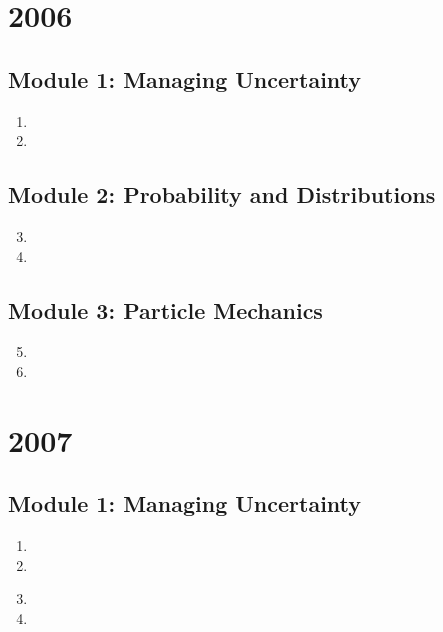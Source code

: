 \documentclass{solutionsmannual}
\begin{document}
\chapter{2006}
\section{Module 1: Managing Uncertainty}
\begin{enumerate}[label=\bfseries  \arabic*.]\setcounter{enumi}{0}
\item 
\item 
\end{enumerate}
\section{Module 2: Probability and Distributions}
\begin{enumerate}[label=\bfseries  \arabic*.]\setcounter{enumi}{2}
\item 
\item 
\end{enumerate}
\section{Module 3: Particle Mechanics}
\begin{enumerate}[label=\bfseries  \arabic*.]\setcounter{enumi}{4}
\item 
\item 
\end{enumerate}

\chapter{2007}
\section{Module 1: Managing Uncertainty}
\begin{enumerate}[label=\bfseries  \arabic*.]\setcounter{enumi}{0}
\item 
\item 
\end{enumerate}
\begin{enumerate}[label=\bfseries  \arabic*.]\setcounter{enumi}{2}
\section{Module 2: Probability and Distributions}
\item 
\item 
\end{enumerate}
\end{document}
